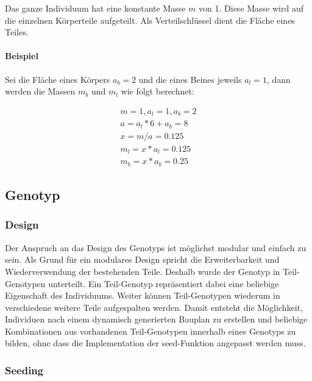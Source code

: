         Das ganze Individuum hat eine konstante Masse \(m\) von 1.
        Diese Masse wird auf die einzelnen Körperteile aufgeteilt.
        Als Verteilschlüssel dient die Fläche eines Teiles.

        \paragraph{Beispiel\label{par:MassExample}}

          Sei die Fläche eines Körpers \(a_{b} = 2 \) und die eines Beines jeweils \(a_{l} = 1\),
          dann werden die Massen \(m_{b}\) und \(m_{l}\) wie folgt berechnet:

          \begin{gather*}
            m = 1, a_{l} = 1, a_{b} = 2 \\
            a = a_{l} * 6 + a_{b} = 8 \\
            x = m / a = 0.125 \\
            m_{l} = x * a_{l} = 0.125 \\
            m_{b} = x * a_{b} = 0.25
          \end{gather*}

    \subsection{Genotyp\label{sub:Genotype}}

      \subsubsection{Design\label{subsub:GenotypeDesign}}

        Der Anspruch an das Design des Genotyps ist möglichst modular und einfach zu sein.
        Als Grund für ein modulares Design spricht die Erweiterbarkeit und Wiederverwendung der bestehenden Teile.
        Deshalb wurde der Genotyp in Teil-Genotypen unterteilt.
        Ein Teil-Genotyp repräsentiert dabei eine beliebige Eigenschaft des Individuums.
        Weiter können Teil-Genotypen wiederum in verschiedene weitere Teile aufgespalten werden.
        Damit entsteht die Möglichkeit, Individuen nach einem dynamisch generierten Bauplan zu erstellen
        und beliebige Kombinationen aus vorhandenen Teil-Genotypen innerhalb eines Genotyps zu bilden,
        ohne dass die Implementation der seed-Funktion angepasst werden muss.

      \subsubsection{Seeding\label{subsub:GenotypeSeeding}}

